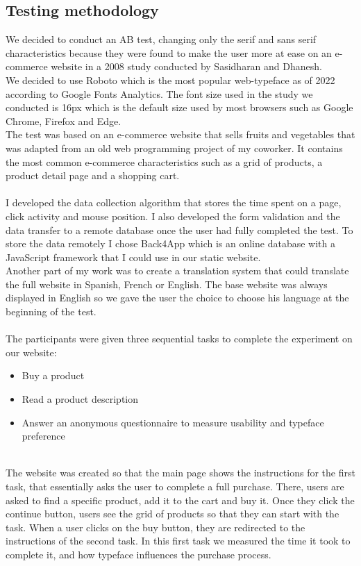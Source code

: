 \documentclass{article}
\begin{document}
\subsection{Testing methodology}
We decided to conduct an AB test, changing only the serif and sans serif characteristics because they were found to make the user more at ease on an e-commerce website in a 2008 study conducted by Sasidharan and Dhanesh.
\\
We decided to use Roboto which is the most popular web-typeface as of 2022 according to Google Fonts Analytics.
The font size used in the study we conducted is 16px which is the default size used by most browsers such as Google Chrome, Firefox and Edge.
\\
The test was based on an e-commerce website that sells fruits and vegetables that was adapted from an old web programming project of my coworker.
It contains the most common e-commerce characteristics such as a grid of products, a product detail page and a shopping cart.
\\
\\
I developed the data collection algorithm that stores the time spent on a page, click activity and mouse position.
I also developed the form validation and the data transfer to a remote database once the user had fully completed the test.
To store the data remotely I chose Back4App which is an online database with a JavaScript framework that I could use in our static website.
\\
Another part of my work was to create a translation system that could translate the full website in Spanish, French or English. The base website was always displayed in English so we gave the user the choice to choose his language at the beginning of the test.
\\\\
The participants were given three sequential tasks to complete the experiment on our website:
\begin{itemize}
\item Buy a product
\item Read a product description
\item Answer an anonymous questionnaire to measure usability and typeface preference
\end{itemize}
\\
The website was created so that the main page shows the instructions for the first task, that essentially asks the user to complete a full purchase. There, users are asked to find a specific product, add it to the cart and buy it. Once they click the continue button, users see the grid of products so that they can start with the task. When a user clicks on the buy button, they are redirected to the instructions of the second task. In this first task we measured the time it took to complete it, and how typeface influences the purchase process.
\end{document}
